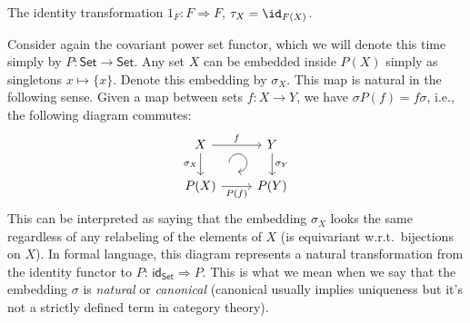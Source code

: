 \begin{example}
    The identity transformation $1_{F}:F\Longrightarrow F$, $\tau_{X}=\id_{F(X)}$.
\end{example}
%
\begin{example}
    Consider again the covariant power set functor, which we will denote this time simply by $P:\mathsf{Set}\to \mathsf{Set}$. Any set $X$ can be embedded inside $P(X)$ simply as singletons $x\mapsto \{x\}$. Denote this embedding by $\sigma_X$. This map is natural in the following sense. Given a map between sets $f:X\to Y$, we have $\sigma P(f)=f \sigma$, i.e., the following diagram commutes:
    \[\begin{tikzcd}[every matrix/.append style={name=m},execute at end picture={\draw [<-] ([xshift=-2.7em,yshift=1mm]m-2-2.north) arc[start angle=-90,delta angle=270,radius=0.25cm];}]
   X \arrow[r,"f"]\arrow[d,swap,"\sigma_X"]& Y\arrow[d,"\sigma_Y"] \\
   P(X)\arrow[r,swap,"P(f)"]& P(Y)
\end{tikzcd}\]
This can be interpreted as saying that the embedding $\sigma_X$ looks the same regardless of any relabeling of the elements of $X$ (is equivariant w.r.t.\ bijections on $X$). In formal language, this diagram represents a natural transformation from the identity functor to $P$: $\mathsf{id}_{\mathsf{Set}}\Longrightarrow P$. This is what we mean when we say that the embedding $\sigma$ is \emph{natural} or \emph{canonical} (canonical usually implies uniqueness but it's not a strictly defined term in category theory).
\end{example}
%
